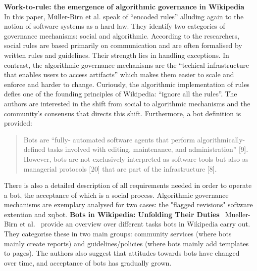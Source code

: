\documentclass[pdftex,a4paper,11pt]{scrartcl}
\begin{document}
\newline
\newline
\textbf{Work-to-rule: the emergence of algorithmic governance in Wikipedia}~\cite{MueDoHer2013}
\newline
\newline
In this paper, Müller-Birn et al. speak of ``encoded rules'' alluding again to the notion of software systems as a hard law.
They identify two categories of governance mechanisms: social and algorithmic.
According to the researchers, social rules are based primarily on communication and are often formalised by written rules and guidelines.
Their strength lies in handling exceptions.
In contrast, the algorithmic governance mechanisms are the ``techical infrastructure that enables users to access artifacts'' which makes them easier to scale and enforce and harder to change.
Curiously, the algorithmic implementation of rules defies one of the founding principles of Wikipedia: ``ignore all the rules''.
The authors are interested in the shift from social to algorithmic mechanisms and the community's consensus that directs this shift.
Furthermore, a bot definition is provided:
\begin{quotation}
Bots are ``fully-
automated software agents that perform algorithmically-defined tasks
involved with editing, maintenance, and administration'' [9]. However, bots are not exclusively interpreted as software tools but also
as managerial protocols [20] that are part of the infrastructure [8].
\end{quotation}
There is also a detailed description of all requirements needed in order to operate a bot, the acceptance of which is a social process.
Algorithmic governance mechanisms are exemplary analysed for two cases: the "flagged revisions" software extention and xqbot.
\newline
\newline
\textbf{Bots in Wikipedia: Unfolding Their Duties}~\cite{MuellerBirn2014}
\newline
\newline
Mueller-Birn et al.~\cite{MuellerBirn2014} provide an overview over different tasks bots in Wikipedia carry out.
They categorise these in two main groups: community services (where bots mainly create reports) and guidelines/policies (where bots mainly add templates to pages).
The authors also suggest that attitudes towards bots have changed over time, and acceptance of bots has gradually grown.
\newline
\newline
\end{document}
